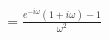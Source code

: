 \documentclass[preview]{standalone}
\begin{document}
\begin{align*}
&=\frac{e^{-i\omega}(1+i\omega)-1}{\omega^{2}}
\end{align*}
\end{document}
